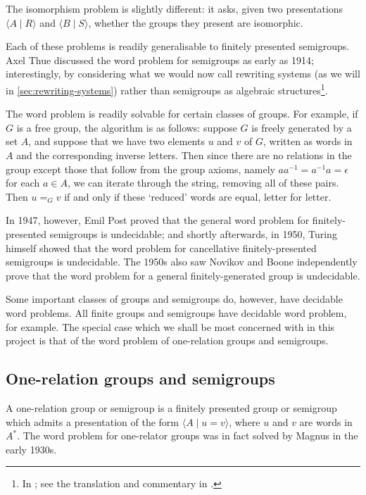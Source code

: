 \documentclass[noindex,noinsetproof,emphthm,12pt]{lmaths}
\begin{document}
The isomorphism problem is slightly different: it asks, given two presentations $\langle A \mid R \rangle$ and $\langle B \mid S \rangle$, whether the groups they present are isomorphic.

Each of these problems is readily generalisable to finitely presented semigroups. Axel Thue discussed the word problem for semigroups as early as 1914; interestingly, by considering what we would now call rewriting systems (as we will in \cref{sec:rewriting-systems}) rather than semigroups as algebraic structures\footnote{In \cite{Thue1914}; see the translation and commentary in \cite{Power2013}.}.

The word problem is readily solvable for certain classes of groups. For example, if $G$ is a free group, the algorithm is as follows: suppose $G$ is freely generated by a set $A$, and suppose that we have two elements $u$ and $v$ of $G$, written as words in $A$ and the corresponding inverse letters. Then since there are no relations in the group except those that follow from the group axioms, namely $aa^{-1} = a^{-1}a = \epsilon$ for each $a \in A$, we can iterate through the string, removing all of these pairs. Then $u =_G v$ if and only if these `reduced' words are equal, letter for letter.

In 1947, however, Emil Post proved \cite{Post1947} that the general word problem for finitely-presented semigroups is undecidable; and shortly afterwards, in 1950, Turing himself showed \cite{Turing1950} that the word problem for cancellative finitely-presented semigroups is undecidable. The 1950s also saw Novikov \cite{Novikov1955} and Boone \cite{Boone1959} independently prove that the word problem for a general finitely-generated group is undecidable.

Some important classes of groups and semigroups do, however, have decidable word problems. All finite groups and semigroups have decidable word problem, for example. The special case which we shall be most concerned with in this project is that of the word problem of one-relation groups and semigroups.

\subsection{One-relation groups and semigroups} \label{sec:one-relation-overview}

A one-relation group or semigroup is a finitely presented group or semigroup which admits a presentation of the form $\langle A \mid u = v\rangle$, where $u$ and $v$ are words in $A^*$. The word problem for one-relator groups was in fact solved by Magnus in the early 1930s.
\end{document}
